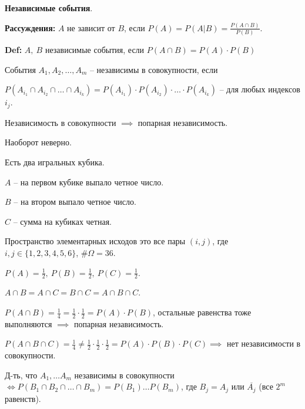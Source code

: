 \begin{definition}
    \textbf{Независимые события}.

    \textbf{Рассуждения:} $A$ не зависит от $B$, если $P(A) = P(A | B) = \frac{P(A \cap B)}{P(B)}$.

    \textbf{Def:} $A, \ B$ независимые события, если $P(A \cap B) = P(A) \cdot P(B)$
\end{definition}

\begin{definition}
    События $A_1, A_2, \dots, A_m$ -- независимы в совокупности, если

    $P(A_{i_1} \cap A_{i_2} \cap \dots \cap A_{i_k}) = P(A_{i_1}) \cdot P(A_{i_2}) \cdot \dots \cdot P(A_{i_k})$ -- для любых индексов $i_j$.
\end{definition}

\begin{remark}
    Независимость в совокупности $\implies$ попарная независимость.

    Наоборот неверно.
\end{remark}

\begin{example}
    Есть два игральных кубика.

    $A$ -- на первом кубике выпало четное число.

    $B$ -- на втором выпало четное число.

    $C$ -- сумма на кубиках четная.

    Пространство элементарных исходов это все пары $(i, j)$, где $i, j \in \{ 1, 2, 3, 4, 5, 6 \}$, $\#\Omega = 36$.

    $P(A) = \frac{1}{2}, \ P(B) = \frac{1}{2}, \ P(C) = \frac{1}{2}$.

    $A \cap B = A \cap C = B \cap C = A \cap B \cap C$.

    $P(A \cap B) = \frac{1}{4} = \frac{1}{2} \cdot \frac{1}{2} = P(A) \cdot P(B)$, остальные равенства тоже выполняются $\implies$ попарная независимость.

    $P(A \cap B \cap C) = \frac{1}{4} \not = \frac{1}{2} \cdot \frac{1}{2} \cdot \frac{1}{2} = P(A) \cdot P(B) \cdot P(C) \implies$ нет независимости в совокупности.
\end{example}

\begin{exerc}
    Д-ть, что $A_1, \dots A_m$ независимы в совокупности $\Leftrightarrow P(B_1 \cap B_2 \cap \dots \cap B_m) = P(B_1) \dots P(B_m)$, где $B_j = A_j$ или $\overline{A_j}$ (все $2^m$ равенств).
\end{exerc}

